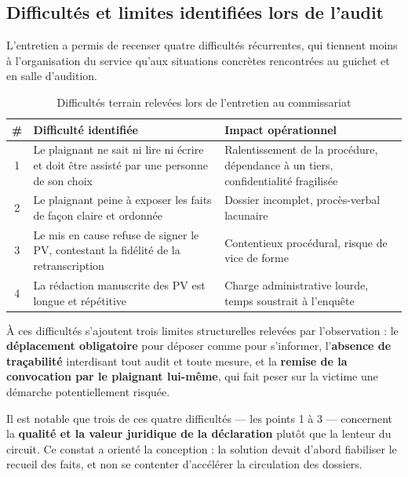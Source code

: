 \subsection{Difficultés et limites identifiées lors de l'audit}

L'entretien a permis de recenser quatre difficultés récurrentes, qui tiennent moins à l'organisation du service qu'aux situations concrètes rencontrées au guichet et en salle d'audition.

\begin{table}[H]
    \centering
    \begin{tabularx}{\linewidth}{|c|>{\raggedright\arraybackslash}X|>{\raggedright\arraybackslash}X|}
    \hline
    \textbf{\#} & \textbf{Difficulté identifiée} & \textbf{Impact opérationnel} \\
    \hline
    1 & Le plaignant ne sait ni lire ni écrire et doit être assisté par une personne de son choix & Ralentissement de la procédure, dépendance à un tiers, confidentialité fragilisée \\
    \hline
    2 & Le plaignant peine à exposer les faits de façon claire et ordonnée & Dossier incomplet, procès-verbal lacunaire \\
    \hline
    3 & Le mis en cause refuse de signer le PV, contestant la fidélité de la retranscription & Contentieux procédural, risque de vice de forme \\
    \hline
    4 & La rédaction manuscrite des PV est longue et répétitive & Charge administrative lourde, temps soustrait à l'enquête \\
    \hline
    \end{tabularx}
    \caption{Difficultés terrain relevées lors de l'entretien au commissariat}
    \label{tab:difficultes}
\end{table}

À ces difficultés s'ajoutent trois limites structurelles relevées par l'observation : le \textbf{déplacement obligatoire} pour déposer comme pour s'informer, l'\textbf{absence de traçabilité} interdisant tout audit et toute mesure, et la \textbf{remise de la convocation par le plaignant lui-même}, qui fait peser sur la victime une démarche potentiellement risquée.

Il est notable que trois de ces quatre difficultés — les points 1 à 3 — concernent la \textbf{qualité et la valeur juridique de la déclaration} plutôt que la lenteur du circuit. Ce constat a orienté la conception : la solution devait d'abord fiabiliser le recueil des faits, et non se contenter d'accélérer la circulation des dossiers.

